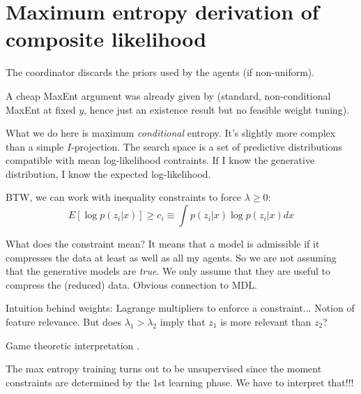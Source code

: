 \documentclass[english]{scrartcl}
\begin{document}
\section{Maximum entropy derivation of composite likelihood}
\label{sec:maxent}

The coordinator discards the priors used by the agents (if non-uniform).

A cheap MaxEnt argument was already given by \cite{Wang-14}  (standard, non-conditional MaxEnt at fixed $y$, hence just an existence result but no feasible weight tuning).

What we do here is maximum {\em conditional} entropy. It's slightly more complex than a simple $I$-projection. The search space is a set of predictive distributions compatible with mean log-likelihood contraints. If I know the generative distribution, I know the expected log-likelihood.

BTW, we can work with inequality constraints to force $\lambda\geq 0$:
$$
E[\log p(z_i|x)] \geq c_i \equiv \int p(z_i|x) \log p(z_i|x) dx
$$

What does the constraint mean? It means that a model is admissible if it compresses the data at least as well as all my agents. So we are not assuming that the generative models are {\em true}. We only assume that they are useful to compress the (reduced) data. Obvious connection to MDL. 

Intuition behind weights: Lagrange multipliers to enforce a constraint... Notion of feature relevance. But does $\lambda_1>\lambda_2$ imply that $z_1$ is more relevant than $z_2$? 

Game theoretic interpretation \cite{Grunwald-04}.

The max entropy training turns out to be unsupervised since the moment
constraints are determined by the 1st learning phase. We have to
interpret that!!!

\end{document}
